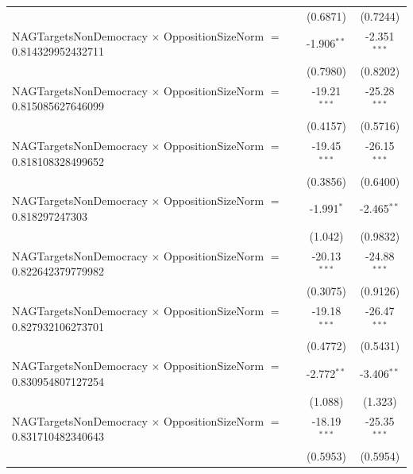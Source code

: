 \begin{tabular}{lcc}
                                                                                & (0.6871)             & (0.7244)\\   
   NAGTargetsNonDemocracy $\times$ OppositionSizeNorm $=$ 0.814329952432711     & -1.906$^{**}$        & -2.351$^{***}$\\   
                                                                                & (0.7980)             & (0.8202)\\   
   NAGTargetsNonDemocracy $\times$ OppositionSizeNorm $=$ 0.815085627646099     & -19.21$^{***}$       & -25.28$^{***}$\\   
                                                                                & (0.4157)             & (0.5716)\\   
   NAGTargetsNonDemocracy $\times$ OppositionSizeNorm $=$ 0.818108328499652     & -19.45$^{***}$       & -26.15$^{***}$\\   
                                                                                & (0.3856)             & (0.6400)\\   
   NAGTargetsNonDemocracy $\times$ OppositionSizeNorm $=$ 0.818297247303        & -1.991$^{*}$         & -2.465$^{**}$\\   
                                                                                & (1.042)              & (0.9832)\\   
   NAGTargetsNonDemocracy $\times$ OppositionSizeNorm $=$ 0.822642379779982     & -20.13$^{***}$       & -24.88$^{***}$\\   
                                                                                & (0.3075)             & (0.9126)\\   
   NAGTargetsNonDemocracy $\times$ OppositionSizeNorm $=$ 0.827932106273701     & -19.18$^{***}$       & -26.47$^{***}$\\   
                                                                                & (0.4772)             & (0.5431)\\   
   NAGTargetsNonDemocracy $\times$ OppositionSizeNorm $=$ 0.830954807127254     & -2.772$^{**}$        & -3.406$^{**}$\\   
                                                                                & (1.088)              & (1.323)\\   
   NAGTargetsNonDemocracy $\times$ OppositionSizeNorm $=$ 0.831710482340643     & -18.19$^{***}$       & -25.35$^{***}$\\   
                                                                                & (0.5953)             & (0.5954)\\   

\end{tabular}
